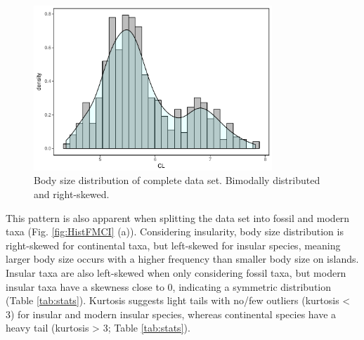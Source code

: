 \begin{figure}[htbp]
	\centering
	\includegraphics[width=0.8\textwidth]{MA_JJ_files/figure-latex/HistAll-1.pdf}
	\caption[CL distribution]{Body size distribution of complete data set. Bimodally distributed and right-skewed.}
	\label{fig:histAll}
\end{figure}

This pattern is also apparent when splitting the data set into fossil and modern taxa (Fig. \ref{fig:HistFMCI} (a)). Considering insularity, body size distribution is right-skewed for continental taxa, but left-skewed for insular species, meaning larger body size occurs with a higher frequency than smaller body size on islands. Insular taxa are also left-skewed when only considering fossil taxa, but modern insular taxa have a skewness close to 0, indicating a symmetric distribution (Table \ref{tab:stats}).
Kurtosis suggests light tails with no/few outliers (kurtosis < 3) for insular and modern insular species, whereas continental species have a heavy tail (kurtosis > 3; Table \ref{tab:stats}).

